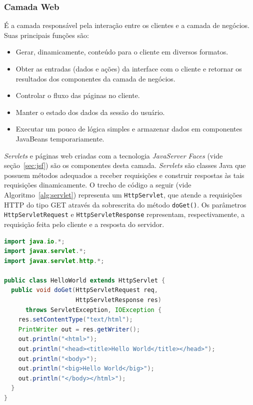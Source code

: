 \documentclass[
  10.5pt,				  %
	openright,			%
	twoside,			  %
  a5paper,
  chapter=TITLE,	%
	section=TITLE,	%
  hyphens,        %
	english,        %
	brazil          %
]{abntex2}
\renewcommand{\lstlistingname}{Algoritmo}%
\begin{document}
\subsubsection{Camada Web}\label{sec:camada-web}

É a camada responsável pela interação entre os clientes e a camada de negócios. Suas principais funções são:
\begin{itemize}
  \item Gerar, dinamicamente, conteúdo para o cliente em diversos formatos.
  \item Obter as entradas (dados e ações) da interface com o cliente e retornar os resultados dos componentes da camada de negócios.
  \item Controlar o fluxo das páginas no cliente.
  \item Manter o estado dos dados da sessão do usuário.
  \item Executar um pouco de lógica simples e armazenar dados em componentes JavaBeans temporariamente.
\end{itemize}

\emph{Servlets} e páginas web criadas com a tecnologia \emph{JavaServer Faces} (vide seção~\ref{sec:jsf}) são os componentes desta camada. \emph{Servlets} são classes Java que possuem métodos adequados a receber requisições e construir respostas às tais requisições dinamicamente. O trecho de código\cite{javaservlet} a seguir (vide \lstlistingname~\ref{alg:servlet}) representa um \texttt{HttpServlet}, que atende a requisições HTTP do tipo GET através da sobrescrita do método \texttt{doGet()}. Os parâmetros \texttt{HttpServletRequest} e \texttt{HttpServletResponse} representam, respectivamente, a requisição feita pelo cliente e a resposta do servidor.
%
\begin{lstlisting}[language=Java, caption={Um \emph{servlet} que imprime ``\emph{Hello World}''.}, label={alg:servlet}]
import java.io.*;
import javax.servlet.*;
import javax.servlet.http.*;

public class HelloWorld extends HttpServlet {
  public void doGet(HttpServletRequest req,
                    HttpServletResponse res)
      throws ServletException, IOException {
    res.setContentType("text/html");
    PrintWriter out = res.getWriter();
    out.println("<html>");
    out.println("<head><title>Hello World</title></head>");
    out.println("<body>");
    out.println("<big>Hello World</big>");
    out.println("</body></html>");
  }
}
\end{lstlisting}
\end{document}
